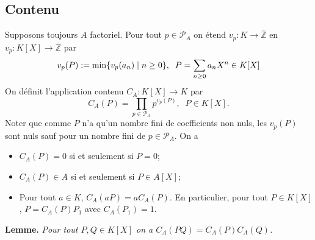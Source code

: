 \documentclass[a4paper, oneside, 12pt]{book}
\theoremstyle{definition} %
\newcommand{\Z}{\mathbb{Z}}
\begin{document}
 

\subsection{Contenu}\label{Contenu}Supposons toujours $A$ factoriel. Pour tout $p\in\mathcal{P}_A$ on étend $v_p:K\rightarrow \overline{\Z} $ en   $v_p:K[X]\rightarrow \overline{\Z}$ par
$$v_p(P):=\hbox{\rm min}\lbrace v_p(a_n)\;|\; n\geq 0\rbrace,\;\; P=\sum_{n\geq 0} a_nX^n\in K[X]$$
  On définit l'application contenu $C_A:K[X]\rightarrow K$ par 
$$C_A(P)=\prod_{p\in \mathcal{P}_A}p^{v_p(P)},\;\; P\in K[X].$$
Noter que comme $P$ n'a qu'un nombre fini de coefficients non nuls, les $v_p(P)$ sont nuls sauf pour un nombre fini de $p\in\mathcal{P}_A$. On a 
\begin{itemize}
\item $C_A(P)=0$ si et seulement si $P=0$;
\item $C_A(P)\in A$ si et seulement si $P\in A[X]$;
\item Pour tout $a\in K $, $C_A(aP)=aC_A(P)$. En particulier, pour tout $P\in K[X]$, $P=C_A(P)P_1$ avec $C_A(P_1)=1$.  \\
\end{itemize}

\textbf{Lemme.} \textit{Pour tout $P,Q\in K[X]$ on a $C_A(PQ)=C_A(P)C_A(Q)$.}
\end{document}

